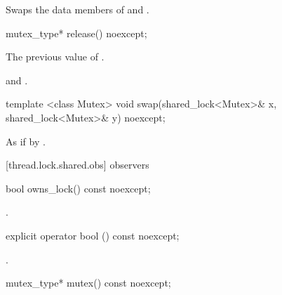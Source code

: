 \begin{itemdescr}
\pnum
\effects Swaps the data members of  and .
\end{itemdescr}

%
%
\begin{itemdecl}
mutex_type* release() noexcept;
\end{itemdecl}

\begin{itemdescr}
\pnum
\returns The previous value of .

\pnum
\postconditions {} and .
\end{itemdescr}

%
%
\begin{itemdecl}
template <class Mutex>
  void swap(shared_lock<Mutex>& x, shared_lock<Mutex>& y) noexcept;
\end{itemdecl}

\begin{itemdescr}
\pnum
\effects As if by .
\end{itemdescr}

[thread.lock.shared.obs]{ observers}

%
%
\begin{itemdecl}
bool owns_lock() const noexcept;
\end{itemdecl}

\begin{itemdescr}
\pnum
\returns {}.
\end{itemdescr}

%
%
\begin{itemdecl}
explicit operator bool () const noexcept;
\end{itemdecl}

\begin{itemdescr}
\pnum
\returns {}.
\end{itemdescr}

%
%
\begin{itemdecl}
mutex_type* mutex() const noexcept;
\end{itemdecl}

